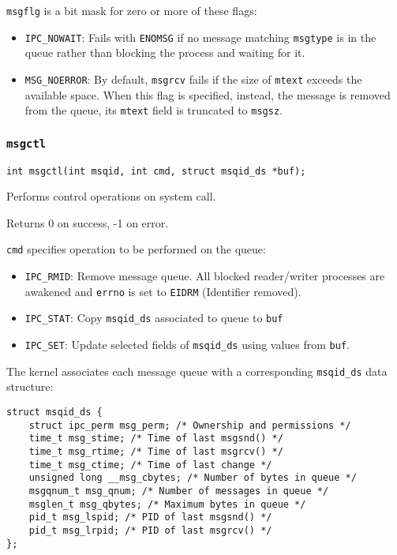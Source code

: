 \documentclass{article}
\begin{document}
\texttt{msgflg} is a bit mask for zero or more of these flags:

\begin{itemize}
    \item \texttt{IPC\_NOWAIT}: Fails with \texttt{ENOMSG} if no message matching \texttt{msgtype} is in the queue rather than blocking the process and waiting for it.
    \item \texttt{MSG\_NOERROR}: By default, \texttt{msgrcv} fails if the size of \texttt{mtext} exceeds the available space. When this flag is specified, instead, the message is removed from the queue, its \texttt{mtext} field is truncated to \texttt{msgsz}.
\end{itemize}


\subsubsection{\texttt{msgctl}}

\begin{verbatim}
int msgctl(int msqid, int cmd, struct msqid_ds *buf);
\end{verbatim}

Performs control operations on system call.

Returns 0 on success, -1 on error.

\texttt{cmd} specifies operation to be performed on the queue:

\begin{itemize}
    \item \texttt{IPC\_RMID}: Remove message queue. All blocked reader/writer processes are awakened and \texttt{errno} is set to \texttt{EIDRM} (Identifier removed).
    \item \texttt{IPC\_STAT}: Copy \texttt{msqid\_ds} associated to queue to \texttt{buf}
    \item \texttt{IPC\_SET}: Update selected fields of \texttt{msqid\_ds} using values from \texttt{buf}.
\end{itemize}

The kernel associates each message queue with a corresponding \texttt{msqid\_ds} data structure:

\begin{verbatim}
struct msqid_ds {
    struct ipc_perm msg_perm; /* Ownership and permissions */
    time_t msg_stime; /* Time of last msgsnd() */
    time_t msg_rtime; /* Time of last msgrcv() */
    time_t msg_ctime; /* Time of last change */
    unsigned long __msg_cbytes; /* Number of bytes in queue */
    msgqnum_t msg_qnum; /* Number of messages in queue */
    msglen_t msg_qbytes; /* Maximum bytes in queue */
    pid_t msg_lspid; /* PID of last msgsnd() */
    pid_t msg_lrpid; /* PID of last msgrcv() */
};
\end{verbatim}
\end{document}
